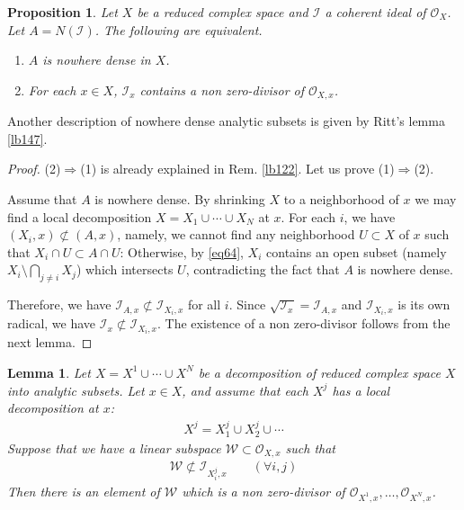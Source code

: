 \documentclass[12pt,b5paper,notitlepage]{report}
\theoremstyle{definition}
\theoremstyle{plain}
\newtheorem{pp}[df]{Proposition}
\newtheorem{lm}[df]{Lemma}
\newcommand{\mc}{\mathcal}
\newcommand{\scr}{\mathscr}
\numberwithin{equation}{section}
\begin{document}
\begin{pp}\label{lb123}
Let $X$ be a reduced complex space and $\mc I$ a coherent ideal of $\scr O_X$. Let $A=N(\mc I)$. The following are equivalent.
\begin{enumerate}[label=(\arabic*)]
\item $A$ is nowhere dense in $X$.
\item For each $x\in X$, $\mc I_x$ contains a non zero-divisor of $\scr O_{X,x}$.
\end{enumerate}
\end{pp}

Another description of nowhere dense analytic subsets is given by Ritt's lemma \ref{lb147}.


\begin{proof}
(2)$\Rightarrow$(1) is already explained in Rem. \ref{lb122}. Let us prove (1)$\Rightarrow$(2).

Assume that $A$ is nowhere dense. By shrinking $X$ to a neighborhood of $x$ we may find a local decomposition $X=X_1\cup\cdots\cup X_N$ at $x$.  For each $i$, we have $(X_i,x)\nsubset(A,x)$, namely, we cannot find any neighborhood $U\subset X$ of $x$ such that $X_i\cap U\subset A\cap U$: Otherwise, by \eqref{eq64}, $X_i$ contains an open subset (namely $X_i\setminus\bigcap_{j\neq i} X_j$) which intersects $U$, contradicting the fact that $A$ is nowhere dense. 

Therefore, we have $\scr I_{A,x}\nsubset \scr I_{X_i,x}$ for all $i$. Since $\sqrt{\mc I_x}=\scr I_{A,x}$ and $\scr I_{X_i,x}$ is its own radical, we have $\mc I_x\nsubset\scr I_{X_i,x}$. The existence of a non zero-divisor follows from the next lemma.
\end{proof}






\begin{lm}\label{lb145}
Let $X=X^1\cup\cdots\cup X^N$ be a decomposition of reduced complex space $X$ into analytic subsets. Let $x\in X$, and assume that each $X^j$ has a local decomposition at $x$:
\begin{align*}
X^j=X^j_1\cup X^j_2\cup\cdots
\end{align*}
Suppose that we have a linear subspace $\scr W\subset\scr O_{X,x}$ such that
\begin{align*}
\scr W\nsubset \scr I_{X^j_i,x}\qquad (\forall i,j)
\end{align*}
Then there is an element of $\scr W$ which is a non zero-divisor of $\scr O_{X^1,x},\dots,\scr O_{X^N,x}$.
\end{lm}
\end{document}

